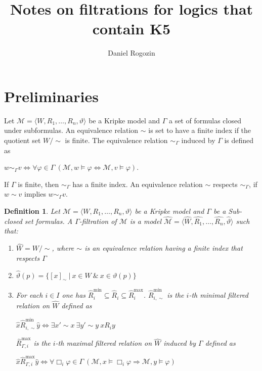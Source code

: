 \documentclass[a4paper]{article}
\author{Daniel Rogozin}
\date{}
\title{Notes on filtrations for logics that contain {\bf K5}}
\theoremstyle{defin}
\newtheorem{defin}{Definition}
\theoremstyle{theorem}
\theoremstyle{prop}
\theoremstyle{lemma}
\theoremstyle{fact}
\theoremstyle{ex}
\theoremstyle{col}
\theoremstyle{claim}
\begin{document}
\maketitle

\section{Preliminaries}

Let $\mathcal{M} = \langle W, R_1, \dots, R_n, \vartheta \rangle$ be a Kripke model and $\Gamma$ a set of formulas closed under subformulas. An equivalence relation $\sim$ is set to have a finite index if the quotient set $W / \sim$ is finite. The equivalence relation $\sim_{\Gamma}$ induced by $\Gamma$ is defined as

\begin{center}
  $w \sim_{\Gamma} v \Leftrightarrow \forall \varphi \in \Gamma \: (\mathcal{M}, w \models \varphi \Leftrightarrow \mathcal{M}, v \models \varphi)$.
\end{center}

If $\Gamma$ is finite, then $\sim_{\Gamma}$ has a finite index. An equivalence relation $\sim$ respects $\sim_{\Gamma}$, if $w \sim v$ implies $w \sim_{\Gamma} v$.

\begin{defin}
  Let $\mathcal{M} = \langle W, R_1, \dots, R_n, \vartheta \rangle$ be a Kripke model and $\Gamma$ be a Sub-closed set formulas. A $\Gamma$-filtration of $\mathcal{M}$ is a model
  $\widehat{\mathcal{M}} = \langle \widehat{W}, \widehat{R_1}, \dots, \widehat{R_n}, \widehat{\vartheta} \rangle$ such that:
  \begin{enumerate}
    \item $\widehat{W} = W / \sim$, where $\sim$ is an equivalence relation having a finite index that respects $\Gamma$
    \item $\widehat{\vartheta}(p) = \{ [x]_{\sim} \: | \: x \in W \: \& \: x \in \vartheta(p)\}$
    \item For each $i \in I$ one has $\widehat{R}_i^{\text{min}} \subseteq \widehat{R}_i \subseteq \widehat{R}_i^{\text{max}}$. $\widehat{R}_{i, \sim}^{\text{min}}$ is the $i$-th minimal filtered relation on $\widehat{W}$ defined as
    \begin{center}
      $\hat{x} \widehat{R}_{i, \sim}^{\text{min}} \hat{y} \Leftrightarrow \exists x' \sim x \: \exists y' \sim y \: x R_i y$
    \end{center}
    $\widehat{R}_{\Gamma,i}^{\text{max}}$ is the $i$-th maximal filtered relation on $\widehat{W}$ induced by $\Gamma$ defined as
    \begin{center}
      $\hat{x} \widehat{R}_{\Gamma,i}^{\text{max}} \hat{y} \Leftrightarrow \forall \Box_i \varphi \in \Gamma \: (\mathcal{M}, x \models \Box_i \varphi \Rightarrow \mathcal{M}, y \models \varphi)$
    \end{center}
  \end{enumerate}
\end{defin}
\end{document}
